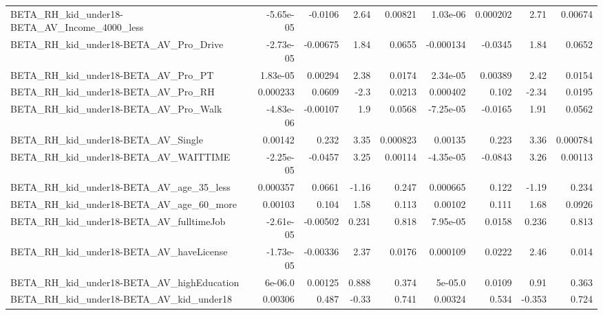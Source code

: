 \begin{tabular}{lrrrrrrrr}
BETA\_RH\_kid\_under18-BETA\_AV\_Income\_4000\_less       &   -5.65e-05 &      -0.0106 &      2.64 &  0.00821 &   1.03e-06 &    0.000202 &         2.71 &       0.00674 \\
BETA\_RH\_kid\_under18-BETA\_AV\_Pro\_Drive              &   -2.73e-05 &     -0.00675 &      1.84 &   0.0655 &  -0.000134 &     -0.0345 &         1.84 &        0.0652 \\
BETA\_RH\_kid\_under18-BETA\_AV\_Pro\_PT                 &    1.83e-05 &      0.00294 &      2.38 &   0.0174 &   2.34e-05 &     0.00389 &         2.42 &        0.0154 \\
BETA\_RH\_kid\_under18-BETA\_AV\_Pro\_RH                 &    0.000233 &       0.0609 &      -2.3 &   0.0213 &   0.000402 &       0.102 &        -2.34 &        0.0195 \\
BETA\_RH\_kid\_under18-BETA\_AV\_Pro\_Walk               &   -4.83e-06 &     -0.00107 &       1.9 &   0.0568 &  -7.25e-05 &     -0.0165 &         1.91 &        0.0562 \\
BETA\_RH\_kid\_under18-BETA\_AV\_Single                 &     0.00142 &        0.232 &      3.35 & 0.000823 &    0.00135 &       0.223 &         3.36 &      0.000784 \\
BETA\_RH\_kid\_under18-BETA\_AV\_WAITTIME               &   -2.25e-05 &      -0.0457 &      3.25 &  0.00114 &  -4.35e-05 &     -0.0843 &         3.26 &       0.00113 \\
BETA\_RH\_kid\_under18-BETA\_AV\_age\_35\_less            &    0.000357 &       0.0661 &     -1.16 &    0.247 &   0.000665 &       0.122 &        -1.19 &         0.234 \\
BETA\_RH\_kid\_under18-BETA\_AV\_age\_60\_more            &     0.00103 &        0.104 &      1.58 &    0.113 &    0.00102 &       0.111 &         1.68 &        0.0926 \\
BETA\_RH\_kid\_under18-BETA\_AV\_fulltimeJob            &   -2.61e-05 &     -0.00502 &     0.231 &    0.818 &   7.95e-05 &      0.0158 &        0.236 &         0.813 \\
BETA\_RH\_kid\_under18-BETA\_AV\_haveLicense            &   -1.73e-05 &     -0.00336 &      2.37 &   0.0176 &   0.000109 &      0.0222 &         2.46 &         0.014 \\
BETA\_RH\_kid\_under18-BETA\_AV\_highEducation          &     6e-06.0 &      0.00125 &     0.888 &    0.374 &    5e-05.0 &      0.0109 &         0.91 &         0.363 \\
BETA\_RH\_kid\_under18-BETA\_AV\_kid\_under18            &     0.00306 &        0.487 &     -0.33 &    0.741 &    0.00324 &       0.534 &       -0.353 &         0.724 \\

\end{tabular}
